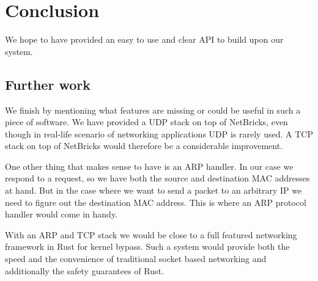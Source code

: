 \documentclass[11pt]{article}
\begin{document}
\section{Conclusion}

We hope to have provided an easy to use and clear API to build upon
our system.

\subsection{Further work}

We finish by mentioning what features are missing or could be useful
in such a piece of software. We have provided a UDP stack on top of
NetBricks, even though in real-life scenario of networking
applications UDP is rarely used. A TCP stack on top of NetBricks would
therefore be a considerable improvement.

One other thing that makes sense to have is an ARP handler. In our
case we respond to a request, so we have both the source and
destination MAC addresses at hand. But in the case where we want to
send a packet to an arbitrary IP we need to figure out the destination
MAC address. This is where an ARP protocol handler would come in
handy.

With an ARP and TCP stack we would be close to a full featured
networking framework in Rust for kernel bypass. Such a system would
provide both the speed and the convenience of traditional socket based
networking and additionally the safety guarantees of Rust.
\end{document}
